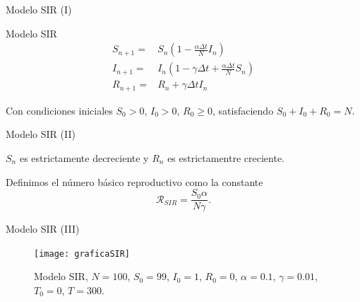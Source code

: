 \begin{frame}{Modelo SIR (I)}

    \begin{block}{Modelo SIR \cite{allenDiscretetimeSISIR1994}}
        \begin{equation}
        \label{eqn: SIR_modelo}
        \begin{aligned}
        S_{n+1} = & S_n \left(1-\frac{\alpha\Delta t}{N} I_n \right) \\
        I_{n+1} = & I_n \left( 1-\gamma \Delta t + \frac{\alpha\Delta t}{N} S_n \right) \\
        R_{n+1} = & R_n + \gamma \Delta t I_n
        \end{aligned}
        \end{equation}
        
        Con condiciones iniciales $S_0>0$, $I_0>0$, $R_0\geq 0$, satisfaciendo $S_0+I_0+R_0=N$.
    \end{block}
\end{frame}


\begin{frame}{Modelo SIR (II)}
        
        


        \begin{lema}
            $S_n$ es estrictamente decreciente y $R_n$ es estrictamentre creciente.
        \end{lema}

        \pause

        \begin{definition}
            Definimos el número básico reproductivo como la constante 
            $$\mathcal{R}_{SIR}=\frac{S_0 \alpha}{N\gamma }.$$
        \end{definition}


\end{frame}

\begin{frame}{Modelo SIR (III)}
    \begin{figure}
        \begin{center}
        \caption{Modelo SIR, $N=100$, $S_0=99$, $I_0 = 1$, $R_0 = 0$, $\alpha = 0.1$, $\gamma = 0.01$, $T_0 = 0$, $T = 300$.}
        \texttt{[image: graficaSIR]}
        \end{center}
    \end{figure}
\end{frame}

